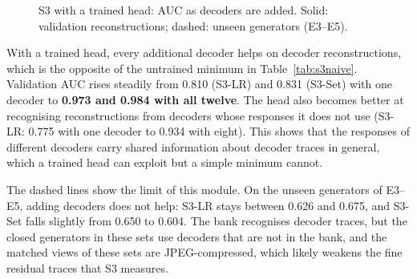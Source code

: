 \begin{figure}[H]
\centering
{}
\caption{S3 with a trained head: AUC as decoders are added. Solid: validation reconstructions; dashed: unseen generators (E3--E5).}
\label{fig:s3k}
\end{figure}

With a trained head, every additional decoder helps on decoder reconstructions, which is the opposite of the untrained minimum in Table~\ref{tab:s3naive}. Validation AUC rises steadily from 0.810 (S3-LR) and 0.831 (S3-Set) with one decoder to \textbf{0.973 and 0.984 with all twelve}. The head also becomes better at recognising reconstructions from decoders whose responses it does not use (S3-LR: 0.775 with one decoder to 0.934 with eight). This shows that the responses of different decoders carry shared information about decoder traces in general, which a trained head can exploit but a simple minimum cannot.

The dashed lines show the limit of this module. On the unseen generators of E3--E5, adding decoders does not help: S3-LR stays between 0.626 and 0.675, and S3-Set falls slightly from 0.650 to 0.604. The bank recognises decoder traces, but the closed generators in these sets use decoders that are not in the bank, and the matched views of these sets are JPEG-compressed, which likely weakens the fine residual traces that S3 measures.

